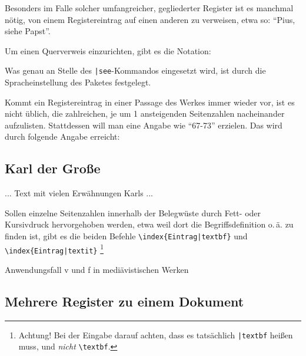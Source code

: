 
Besonders im Falle solcher umfangreicher, gegliederter Register ist es manchmal nötig,
von einem Registereintrag auf einen anderen zu verweisen, etwa so: \enquote{Pius, siehe Papst}.

Um einen Querverweis einzurichten, gibt es die Notation:

\begin{lfgwcode}{}
\end{lfgwcode}

Was genau an Stelle des \lstinline/|see/-Kommandos eingesetzt wird, ist durch die Spracheinstellung des 
Paketes  festgelegt.


Kommt ein Registereintrag in einer Passage des Werkes immer wieder vor, ist es nicht üblich, die
zahlreichen, je um 1 ansteigenden Seitenzahlen nacheinander aufzulisten. Stattdessen will man
eine Angabe wie \enquote{67-73} erzielen. Das wird durch folgende Angabe erreicht:

\begin{lfgwcode}{}
    \chapter{Karl der Große}
    ... Text mit vielen Erwähnungen Karls ...
\end{lfgwcode}


Sollen einzelne Seitenzahlen innerhalb der Belegwüste durch Fett- oder Kursivdruck hervorgehoben
werden, etwa weil dort die Begriffsdefinition o.\,ä. zu finden ist, gibt es die beiden Befehle
\lstinline/\index{Eintrag|textbf}/ und 
\lstinline/\index{Eintrag|textit}/%
\footnote{Achtung! Bei der Eingabe darauf achten, dass es tatsächlich 
    \lstinline/|textbf/ heißen muss, und \emph{nicht} 
    \lstinline/\textbf/.}




Anwendungsfall v und f in mediävistischen Werken



\section{Mehrere Register zu einem Dokument}

